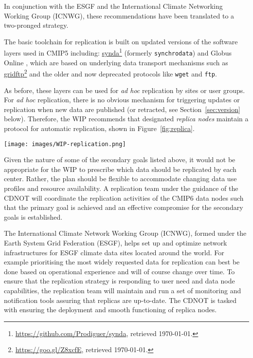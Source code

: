 \documentclass[gmd,manuscript]{copernicus}
\newcommand{\pllabel}[1]{\label{p-#1}\linelabel{l-#1}}
\newcommand{\urlref}[2] {\href{#1}{#2}\footnote{\url{#1}, retrieved \today.}}
\begin{document}
In conjunction with the ESGF and the International Climate Networking
Working Group (ICNWG), these recommendations have been translated to a
two-pronged strategy.

The basic toolchain for replication is built on updated versions of
the software layers used in CMIP5 including:
\urlref{https://github.com/Prodiguer/synda}{synda} (formerly
\texttt{synchrodata}) and Globus Online \citep{ref:chardetal2015}, which
are based on underlying data transport mechanisms such as
\urlref{https://goo.gl/Z8xcfE}{gridftp} and the older and now deprecated
protocols like \texttt{wget} and \texttt{ftp}.

As before, these layers can be used for \emph{ad hoc} replication by
sites or user groups. For \emph{ad hoc} replication, there is no
obvious mechanism for triggering updates or replication when new data
are published (or retracted, see Section~\ref{sec:version} below). Therefore,
the WIP recommends that designated \emph{replica nodes} maintain a
protocol for automatic replication, shown in Figure~\ref{fig:replica}.

\begin{figure*}
  \begin{center}
    \texttt{[image: images/WIP-replication.png]}
  \end{center}
  \caption{CMIP6 replication from data nodes to replica centers and
    between replica centers coordinated by a CMIP6 replication team,
    under the guidance of the CDNOT.}
  \label{fig:replica}
\end{figure*}

Given the nature of some of the secondary goals listed above, it would
not be appropriate for the WIP to prescribe which data should be
replicated by each center. Rather, the plan should be flexible to
accommodate changing data use profiles and resource availability.
\pllabel{RC1-61}
A replication team under the guidance of the CDNOT will coordinate the
replication activities of the CMIP6 data nodes such that the primary
goal is achieved and an effective compromise for the secondary goals
is established.

The International Climate Network Working Group (ICNWG), formed under
the Earth System Grid Federation (ESGF), helps set up and optimize
network infrastructures for ESGF climate data sites located around the
world. For example prioritising the most widely requested data for
replication can best be done based on operational experience and will
of course change over time. To ensure that the replication strategy is
responding to user need and data node capabilities, the replication
team will maintain and run a set of monitoring and notification tools
assuring that replicas are up-to-date. The CDNOT is tasked with
ensuring the deployment and smooth functioning of replica nodes.
\end{document}
